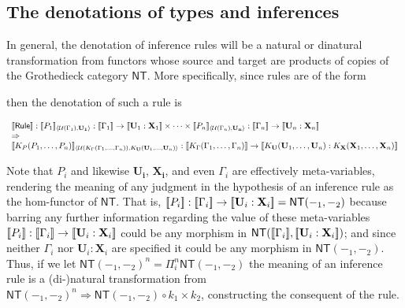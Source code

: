 \subsection{The denotations of types and inferences}
In general, the denotation of inference rules will be a natural or dinatural transformation from functors whose source and target are products of copies of the Grothedieck category $\mathsf{NT}$. More specifically, since rules are of the form

\begin{mathpar}
\end{mathpar}

then the denotation of such a rule is

$$\begin{array}{l}
  \meaningof{\mathsf{Rule}} : \meaningof{P_{1}}_{\langle \mathcal{U}(\Gamma_{1}),\mathbf{U_{1}}\rangle} : \meaningof{\Gamma_{1}} \to \meaningof{\mathbf{U}_{1} : \mathbf{X}_{1}} \times \cdots \times \meaningof{P_{n}}_{\langle \mathcal{U}(\Gamma_{n}),\mathbf{U_{n}}\rangle} : \meaningof{\Gamma_{n}} \to \meaningof{\mathbf{U}_{n} : \mathbf{X}_{n}} \\\Rightarrow\\ \meaningof{K_{P}(P_{1},\ldots,P_{n})}_{\langle \mathcal{U}(K_{\Gamma}(\Gamma_{1},\ldots,\Gamma_{n})),K_{\mathbf{U}}(\mathbf{U}_{1},\ldots,\mathbf{U}_{n})\rangle} : \meaningof{K_{\Gamma}(\Gamma_{1},\ldots,\Gamma_{n})} \to \meaningof{K_{\mathbf{U}}(\mathbf{U}_{1},\ldots,\mathbf{U}_{n}) : K_{\mathbf{X}}(\mathbf{X}_{1},\ldots,\mathbf{X}_{n})}
\end{array}$$

Note that $P_{i}$ and likewise $\mathbf{U_{i}}$, $\mathbf{X_{i}}$, and
even $\Gamma_{i}$ are effectively meta-variables, rendering the
meaning of any judgment in the hypothesis of an inference rule as the
hom-functor of $\mathsf{NT}$. That is, $\meaningof{P_{i}} : \meaningof{\Gamma_{i}} \to \meaningof{\mathbf{U}_{i} : \mathbf{X}_{i}} = \mathsf{NT}(-_{1},-_{2})$ because barring any further information regarding the value of these meta-variables $\meaningof{P_{i}} : \meaningof{\Gamma_{i}} \to \meaningof{\mathbf{U}_{i} : \mathbf{X}_{i}}$ could be any morphism in $\mathsf{NT}(\meaningof{\Gamma_{i}},\meaningof{\mathbf{U}_{i} : \mathbf{X}_{i}})$; and since neither $\Gamma_{i}$ nor $\mathbf{U}_{i} : \mathbf{X}_{i}$ are specified it could be any morphism in $\mathsf{NT}(-_{1},-_{2})$. Thus, if we let $\mathsf{NT}(-_{1}, -_{2})^n = \Pi_{i}^{n}\mathsf{NT}(-_{1}, -_{2})$ the meaning of an inference rule is a (di-)natural transformation from $\mathsf{NT}(-_{1}, -_{2})^{n} \Rightarrow \mathsf{NT}(-_{1}, -_{2}) \circ k_{1} \times k_{2}$, constructing the consequent of the rule.

